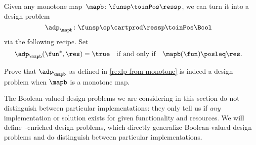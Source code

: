 \begin{remark}
    \label{re:dp-from-monotone}
    Given any monotone map~$\mapb\colon \funsp \toinPos \ressp$, we can turn it into a design problem
    \begin{equation*}
        \adp_\mapb \colon \funsp\op \cartprod \ressp \toinPos \Bool
    \end{equation*}
    via the following recipe.
    Set
    \begin{equation*}
        \adp_\mapb (\fun^*, \res) = \true \quad \text{if and only if} \quad \mapb(\fun) \posleq \res.
    \end{equation*}
\end{remark}

\begin{exercise}
    \label{ex:adp-monotone}
    Prove that $\adp_\mapb$ as defined in \cref{re:dp-from-monotone} is indeed a design problem when $\mapb$ is a monotone map.
\end{exercise}
\begin{solution}
\end{solution}

The Boolean-valued design problems we are considering in this section do not distinguish between particular implementations:
they only tell us if \emph{any} implementation or solution exists for given functionality and resources.
We will define~\Set-enriched design problems, which directly generalize Boolean-valued design problems and do distinguish between particular implementations.



